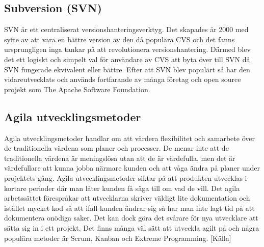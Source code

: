 \subsection{Subversion (SVN)}
SVN är ett centraliserat versionshanteringsverktyg. Det skapades år 2000 med syfte av att vara en bättre version av den då populära CVS och det fanns ursprungligen inga tankar på att revolutionera versionshantering. Därmed blev det ett logiskt och simpelt val för användare av CVS att byta över till SVN då SVN fungerade ekvivalent eller bättre. Efter att SVN blev populärt så har den vidareutvecklats och används fortfarande av många företag\cite{vcs-popularity} och open source projekt som The Apache Software Foundation\cite{apache-dev-svn}.\cite{svn-book}

\subsection{Agila utvecklingsmetoder}
Agila utvecklingsmetoder handlar om att värdera flexibilitet och samarbete över de traditionella värdena som planer och processer. De menar inte att de traditionella värdena är meningslösa utan att de är värdefulla, men det är värdefullare att kunna jobba närmare kunden och att våga ändra på planer under projektets gång. Agila utvecklingsmetoder siktar på att produkten utvecklas i kortare perioder där man låter kunden få säga till om vad de vill. Det agila arbetssättet förespråkar att utvecklarna skriver väldigt lite dokumentation och istället mycket kod så att ifall kunden ändrar sig så har man inte lagt tid på att dokumentera onödiga saker. Det kan dock göra det svårare för nya utvecklare att sätta sig in i ett projekt.
Det finns många väl sätt att utveckla agilt på och några populära metoder är Scrum, Kanban och Extreme Programming. [Källa]